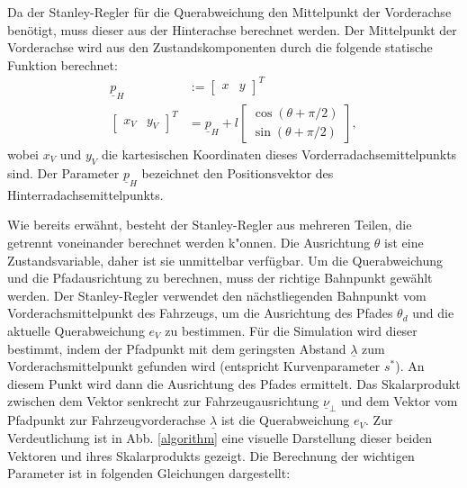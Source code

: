 \documentclass[arbeit=studie,oneside,BCOR=12mm]{ArbeitRST}
\begin{document}
Da der Stanley-Regler für die Querabweichung den Mittelpunkt der Vorderachse
benötigt, muss dieser aus der Hinterachse berechnet werden. Der Mittelpunkt der
Vorderachse wird aus den Zustandskomponenten durch die folgende statische
Funktion \cite{car-model} berechnet: 
\begin{subequations}
\begin{align}
    \underline{p}_H &:= 
  \begin{bmatrix}
    x & y
  \end{bmatrix}^T \\
  \begin{bmatrix}
    x_V & y_V
  \end{bmatrix}^T
    &= \underline{p}_H + l 
  \begin{bmatrix}
    \cos(\theta + \pi/2) \\ 
    \sin(\theta + \pi/2)
  \end{bmatrix},
  \label{eq:Transformation from Rear Axle to Front Axle}
\end{align}
\end{subequations}
wobei $x_V$ und $y_V$ die kartesischen Koordinaten dieses Vorderradachsemittelpunkts sind.
Der Parameter $\underline{p}_H$ bezeichnet den Positionsvektor des Hinterradachsemittelpunkts.

Wie bereits erwähnt, besteht der Stanley-Regler aus mehreren Teilen, die
getrennt voneinander berechnet werden k"onnen. Die Ausrichtung $\theta$ ist eine
Zustandsvariable, daher ist sie unmittelbar verfügbar. Um die Querabweichung und die
Pfadausrichtung zu berechnen, muss der richtige Bahnpunkt gewählt werden. Der
Stanley-Regler verwendet den nächstliegenden Bahnpunkt vom
Vorderachsmittelpunkt des Fahrzeugs, um die Ausrichtung des Pfades $\theta_d$
und die aktuelle Querabweichung $e_{V}$ zu bestimmen. Für die Simulation wird
dieser bestimmt, indem der Pfadpunkt mit dem geringsten Abstand $\underline{\lambda}$ zum
Vorderachsmittelpunkt gefunden wird (entspricht Kurvenparameter $s^*$). An diesem Punkt wird
dann die Ausrichtung des Pfades ermittelt. Das Skalarprodukt zwischen dem
Vektor senkrecht zur Fahrzeugausrichtung $\underline{\nu}_{\perp}$ und dem Vektor
vom Pfadpunkt zur Fahrzeugvorderachse $\underline{\lambda}$ ist die
Querabweichung $e_{V}$. Zur Verdeutlichung ist in Abb. \ref{algorithm} eine visuelle
Darstellung dieser beiden Vektoren und ihres Skalarprodukts gezeigt. Die Berechnung
der wichtigen Parameter ist in folgenden Gleichungen dargestellt: \\
\end{document}
